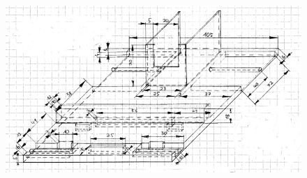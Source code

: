 \begin{figure}
	\includegraphics[width=14.5cm,angle=0]{content/pictures/bodenplatte.png}
\end{figure}

